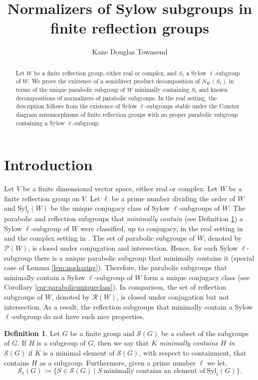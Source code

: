 \documentclass[12pt]{amsart}
\title[Normalizers of Sylows in finite reflection groups]{Normalizers of Sylow subgroups in finite reflection groups}
\author[Kane D. Townsend]{Kane Douglas Townsend}
\theoremstyle{plain}
\theoremstyle{definition}
\newtheorem{definition}[theorem]{Definition}
\numberwithin{equation}{section}
\numberwithin{equation}{section}
\begin{document}
	
	\begin{abstract}
		Let $W$ be a finite reflection group, either real or complex, and $S_\ell$ a Sylow $\ell$-subgroup of $W$. We prove the existence of a semidirect product decomposition of $N_W(S_\ell)$ in terms of the unique parabolic subgroup of $W$ minimally containing $S_\ell$ and known decompositions of normalizers of parabolic subgroups. In the real setting, the description follows from the existence of Sylow $\ell$-subgroups stable under the Coxeter diagram automorphisms of finite reflection groups with no proper parabolic subgroup containing a Sylow $\ell$-subgroup. 
	\end{abstract}
	
	\maketitle
	
	
	\section{Introduction}\label{intro}
	
	Let $V$ be a finite dimensional vector space, either real or complex. Let $W$ be a finite reflection group on $V$. Let $\ell$ be a prime number dividing the order of $W$ and $\text{Syl}_\ell(W)$ be the unique conjugacy class of Sylow $\ell$-subgroups of $W$. The parabolic and reflection subgroups that \emph{minimally contain} (see Definition \ref{def:minimallycontains}) a Sylow $\ell$-subgroup of $W$ were classified, up to conjugacy, in the real setting in \cite{ME} and the complex setting in \cite{METOO}. The set of parabolic subgroups of $W$, denoted by $\mathcal{P}(W)$, is closed under conjugation and intersection. Hence, for each Sylow $\ell$-subgroup there is a unique parabolic subgroup that minimally contains it (special case of Lemma \ref{lem:nosharing}). Therefore, the parabolic subgroups that minimally contain a Sylow $\ell$-subgroup of $W$ form a unique conjugacy class (see Corollary \ref{cor:parabolicuniqueclass}). In comparison, the set of reflection subgroups of $W$, denoted by $\mathcal{R}(W)$, is closed under conjugation but not intersection. As a result, the reflection subgroups that minimally contain a Sylow $\ell$-subgroup do not have such nice properties.
	
	\begin{definition}\label{def:minimallycontains}
		Let $G$ be a finite group and $\mathcal{S}(G)$ be a subset of the subgroups of $G$. If $H$ is a subgroup of $G$, then we say that $K$ \emph{minimally contains $H$ in $\mathcal{S}(G)$} if $K$ is a minimal element of $\mathcal{S}(G)$, with respect to containment, that contains $H$ as a subgroup. Furthermore, given a prime number $\ell$ we let, \[\mathcal{S}_\ell(G):=\{S\in\mathcal{S}(G) \mid S \ \text{minimally contains an element of} \ \text{Syl}_\ell(G)\}.\] 
	\end{definition}
	
\end{document}
